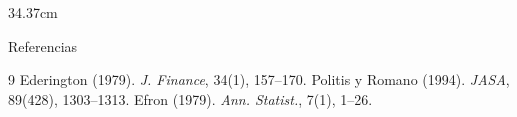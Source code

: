 \documentclass[final]{beamer}
\begin{document}
\begin{frame}[t]
\begin{columns}[T,onlytextwidth]
\begin{column}{34.37cm}
\begin{block}{Referencias}
\begin{thebibliography}{9}
   Ederington (1979). \emph{J. Finance}, 34(1), 157--170.
   Politis y Romano (1994). \emph{JASA}, 89(428), 1303--1313.
   Efron (1979). \emph{Ann. Statist.}, 7(1), 1--26.
\end{thebibliography}
\end{block}

\end{column}
\end{columns}

\end{frame}
\end{document}

